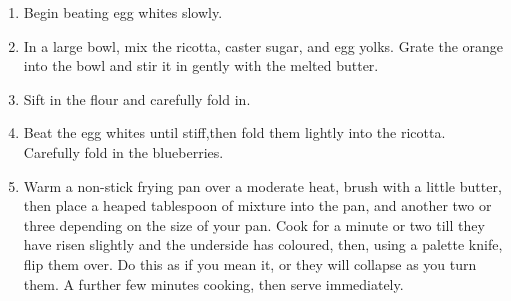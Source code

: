 
\begin{ingredients}
\end{ingredients}


\begin{recipe}
  \begin{enumerate}

  \item Begin beating egg whites slowly.

  \item In a large bowl, mix the ricotta, caster sugar, and egg
    yolks. Grate the orange into the bowl and stir it in gently with
    the melted butter.

  \item Sift in the flour and carefully fold in.

  \item Beat the egg whites until stiff,then fold them lightly into
    the ricotta.  Carefully fold in the blueberries.

  \item Warm a non-stick frying pan over a moderate heat, brush with a
    little butter, then place a heaped tablespoon of mixture into the
    pan, and another two or three depending on the size of your
    pan. Cook for a minute or two till they have risen slightly and
    the underside has coloured, then, using a palette knife, flip them
    over.  Do this as if you mean it, or they will collapse as you
    turn them.  A further few minutes cooking, then serve immediately.
    
  \end{enumerate}
\end{recipe}





